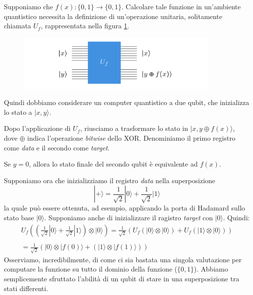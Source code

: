 Supponiamo che $f(x): \{0,1\} \rightarrow \{0,1\}$. Calcolare tale funzione
in un'ambiente quantistico necessita la definizione di un'operazione 
unitaria, solitamente chiamata $U_f$, rappresentata nella figura \ref{fig14}.
\begin{figure}[h]
    \centering
    \includegraphics[width = 10cm]{./Images/uf.png}
    \caption{}
    \label{fig14}
\end{figure}
 Quindi dobbiamo considerare un computer quantistico a due qubit,
 che inizializza lo stato a $|x,y\rangle$. 
 
 Dopo l'applicazione di $U_f$, riusciamo a trasformare lo stato in $|x,y \oplus f(x)\rangle$, 
 dove $\oplus$ indica l'operazione \textit{bitwise} dello XOR. Denominiamo il primo registro come
 \textit{data} e il secondo come \textit{target}.

 \begin{oss}{}{}
    Se $y=0$, allora lo stato finale del secondo qubit è equivalente
    ad $f(x)$.
 \end{oss}

 Supponiamo ora che inizializziamo il registro \textit{data} nella superposizione
 \begin{equation*}
    |+\rangle = \frac{1}{\sqrt{2}}|0\rangle + \frac{1}{\sqrt{2}}|1\rangle
 \end{equation*}
 la quale può essere ottenuta, ad esempio, applicando la porta di Hadamard
 sullo stato base $|0\rangle$. Supponiamo anche di inizializzare il ragistro
 \textit{target} con $|0\rangle$. Quindi:
 \begin{equation*}
    \begin{array}{c}
        U_f\left(\left(\frac{1}{\sqrt{2}}|0\rangle + \frac{1}{\sqrt{2}}|1\rangle\right)\otimes |0\rangle\right) = \frac{1}{\sqrt{2}}\left(U_f \left(|0\rangle \otimes |0\rangle\right) + U_f \left(|1\rangle \otimes |0\rangle\right)\right) \\ \\
        = \frac{1}{\sqrt{2}}\left(|0\rangle \otimes |f(0)\rangle + (|1\rangle \otimes |f(1)\rangle)\right)
    \end{array}
 \end{equation*}
 Osserviamo, incredibilmente, di come ci sia bastata una singola 
 valutazione per computare la funzione su tutto il dominio della funzione ($\{0,1\}$).
 Abbiamo semplicemente sfruttato l'abilità di un qubit di stare
 in una superposizione tra stati differenti.

